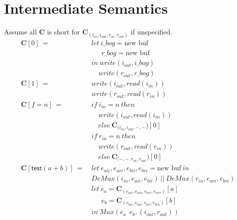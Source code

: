 \documentclass[12pt, letterpaper]{article}
\begin{document}
\section{Intermediate Semantics}
  Assume all $\mathbf{C}$ is short for $\mathbf{C}_{(i_{in},i_{out},r_{in},r_{out})}$ if unspecified.
  {\fontsize{12pt}{14pt}\selectfont
  \begin{align*}
    \mathbf{C}[0]\ 
      =\ &
      let\ i\_bog = \text{new buf}\\
      &\quad\ \ r\_bog = \text{new buf}\\
      &in\ write(i_{out}, i\_bog)\\
      &\quad  write(r_{out}, r\_bog)\\
    \mathbf{C}[1]\ 
      =\ &
      write(i_{out}, read(i_{in}))\\
      &write(r_{out}, read(r_{in}))
      \\
    \mathbf{C}[f = n]\
       =\
       &if\ i_{in}=n\ then\\
       &\quad write(i_{out}, read(i_{in}))\\
       &\quad else\ \mathbf{C}_{(i_{in}, i_{out}, -, -})[0]\\
       &if\ r_{in}=n\ then\\
       &\quad write(r_{out}, read(r_{in}))\\
       &\quad else\ \mathbf{C}_{(-, -, r_{in}, r_{out}})[0]\\
    \mathbf{C}[\mathsf{test}(a + b)]\ 
      =\ &
      let\ e_{aii}, e_{ari}, e_{bii}, e_{bri} = \text{new buf}\ in\\
         &DeMux(i_{in}, e_{aii}, e_{bii})\ ||\ DeMux(r_{in}, e_{ari}, e_{bri})\\
      &let\ e_a = \mathbf{C}_{(e_{aii},e_{aio},e_{ari},e_{aro})}[a]\\
      &\quad\ \ e_b = \mathbf{C}_{(e_{bii},e_{bio},e_{bri},e_{bro})}[b]\\
      &in\ Mux(e_a\ \ e_b, (i_{out},r_{out}))\\
  \end{align*}
  \begin{align*}

\end{align*}}
\end{document}
